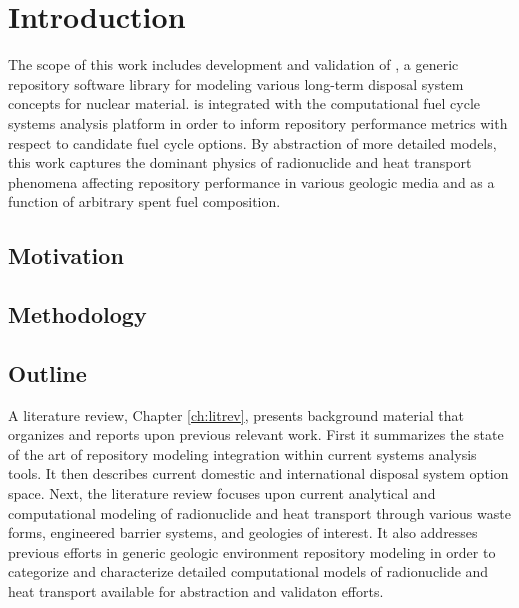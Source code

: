 \chapter{Introduction}\label{ch:introduction}


The scope of this work includes development and validation of \Cyder, a generic 
repository software library for modeling various long-term disposal system concepts 
for nuclear material. \Cyder is integrated with the \Cyclus 
computational fuel cycle systems analysis platform in order to inform 
repository performance metrics with respect to candidate fuel cycle options.  
By abstraction of more detailed models, this work captures the dominant physics 
of radionuclide and heat transport phenomena affecting repository performance 
in various geologic media and as a function of arbitrary spent fuel 
composition. 

\section{Motivation} 


\section{Methodology} 

\section{Outline}

A literature review, Chapter \ref{ch:litrev}, presents background material that organizes and 
reports upon previous relevant work. First it summarizes the state of the art of 
repository modeling integration within current systems analysis tools. It then 
describes current domestic and international disposal system option space. 
Next, the literature review focuses upon current analytical and 
computational modeling of radionuclide and heat transport through various waste 
forms, engineered barrier systems, and geologies of interest.  It also 
addresses previous efforts in generic geologic environment repository modeling in order to 
categorize and characterize detailed computational models of radionuclide and 
heat transport available for abstraction and validaton efforts.


